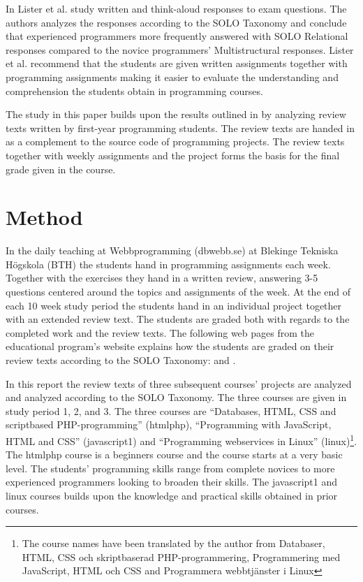 \documentclass[twoside,twocolumn,a4paper,11pt,english]{article}
\begin{document}
In \cite{lister2006not} Lister et al. study written and think-aloud responses to exam questions. The authors analyzes the responses according to the SOLO Taxonomy and conclude that experienced programmers more frequently answered with SOLO Relational responses compared to the novice programmers' Multistructural responses. Lister et al. recommend that the students are given written assignments together with programming assignments making it easier to evaluate the understanding and comprehension the students obtain in programming courses.

The study in this paper builds upon the results outlined in \cite{lister2006not} by analyzing review texts written by first-year programming students. The review texts are handed in as a complement to the source code of programming projects. The review texts together with weekly assignments and the project forms the basis for the final grade given in the course.




\section{Method}

In the daily teaching at Webbprogramming (dbwebb.se) at Blekinge Tekniska Högskola (BTH) the students hand in programming assignments each week. Together with the exercises they hand in a written review, answering 3-5 questions centered around the topics and assignments of the week. At the end of each 10 week study period the students hand in an individual project together with an extended review text. The students are graded both with regards to the completed work and the review texts. The following web pages from the educational program's website explains how the students are graded on their review texts according to the SOLO Taxonomy: \cite{redovisning} and \cite{solo}.

In this report the review texts of three subsequent courses' projects are analyzed and analyzed according to the SOLO Taxonomy. The three courses are given in study period 1, 2, and 3. The three courses are ``Databases, HTML, CSS and scriptbased PHP-programming'' (htmlphp), ``Programming with JavaScript, HTML and CSS'' (javascript1) and ``Programming webservices in Linux'' (linux)\footnote{The course names have been translated by the author from Databaser, HTML, CSS och skriptbaserad PHP-programmering, Programmering med JavaScript, HTML och CSS and Programmera webbtjänster i Linux}. The htmlphp course is a beginners course and the course starts at a very basic level. The students' programming skills range from complete novices to more experienced programmers looking to broaden their skills. The javascript1 and linux courses builds upon the knowledge and practical skills obtained in prior courses.
\end{document}
